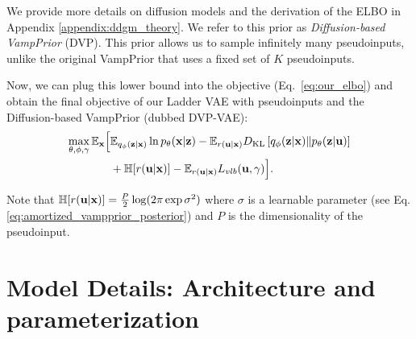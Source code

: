 We provide more details on diffusion models and the derivation of the ELBO in Appendix \ref{appendix:ddgm_theory}. We refer to this prior as \textit{Diffusion-based VampPrior} (DVP). This prior allows us to sample infinitely many pseudoinputs, unlike the original VampPrior that uses a fixed set of $K$ pseudoinputs.

Now, we can plug this lower bound into the objective (Eq.~\ref{eq:our_elbo}) and obtain the final objective of our Ladder VAE with pseudoinputs and the Diffusion-based VampPrior (dubbed DVP-VAE):
\begin{equation}\label{eq:5_dvp_our_elbo_final}
\begin{aligned}
    \max_{\theta, \phi, \gamma}\E_{\rvx} \Bigl[
     &\E_{\Enc{\rvz}{\rvx}} \ln \Dec{\rvx}{\rvz} 
     - \E_{r(\rvu|\rvx)}\KL{q_{\phi}(\rvz|\rvx)}{p_{\theta}(\rvz|\rvu)} \\
     &+ \mathbb{H}[r(\rvu|\rvx)] 
     - \E_{r(\rvu|\rvx)} L_{vlb}(\rvu, \gamma)\Bigr].
\end{aligned}
\end{equation}


Note that $\mathbb{H}[r({\mathbf{u}}|{\mathbf{x}})] = \frac{P}{2}\log(2\pi \exp \sigma^2)$ where $\sigma$ is a learnable parameter (see Eq. \ref{eq:amortized_vampprior_posterior}) and $P$ is the dimensionality of the pseudoinput.

\section{Model Details: Architecture and parameterization} \label{sec:architecture}

